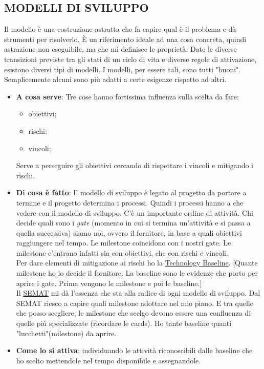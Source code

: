 		\subsection{MODELLI DI SVILUPPO}  \label{modelli}
		Il modello è una costruzione astratta che fa capire qual è il problema e dà strumenti per risolverlo. È un riferimento ideale ad una cosa concreta, quindi astrazione non eseguibile, ma che mi definisce le proprietà. Date le diverse transizioni previste tra gli stati di un ciclo di vita e diverse regole di attivazione, esistono diversi tipi di modelli.
		I modelli, per essere tali, sono tutti "buoni". Semplicemente alcuni sono più adatti a certe esigenze rispetto ad altri.
		\begin{itemize}
			\item \textbf{A cosa serve}:
			Tre cose hanno fortissima influenza sulla scelta da fare:
			\begin{itemize}
				\item obiettivi;
				\item rischi;
				\item vincoli;
			\end{itemize}
			Serve a perseguire gli obiettivi cercando di rispettare i vincoli e mitigando i rischi.
			\item \textbf{Di cosa è fatto}:
			Il modello di sviluppo è legato al progetto da portare a termine e il progetto determina i processi. Quindi i processi hanno a che vedere con il modello di sviluppo. C'è un importante ordine di attività. Chi decide quali sono i \textit{gate} (momento in cui si termina un'attività e si passa a quella successiva) siamo noi, ovvero il fornitore, in base a quali obiettivi raggiungere nel tempo. Le milestone coincidono con i nostri gate. Le milestone c'entrano infatti sia con obiettivi, che con rischi e vincoli. \\
			Per dare elementi di mitigazione ai rischi ho la \underline{\hyperref[technologybaseline]{Technology Baseline}}. [Quante milestone ho lo decide il fornitore. La baseline sono le evidenze che porto per aprire i gate. Prima vengono le milestone e poi le baseline.] \\
			Il \underline{\hyperref[semat]{SEMAT}} mi dà l'essenza che sta alla radice di ogni modello di sviluppo. Dal SEMAT riesco a capire quali milestone adottare nel mio piano. E tra quelle che posso scegliere, le milestone che scelgo devono essere una confluenza di quelle più specializzate (ricordare le cards). Ho tante baseline quanti "lucchetti"(milestone) da aprire.
			\item \textbf{Come lo si attiva}: individuando le attività riconoscibili dalle baseline che ho scelto mettendole nel tempo disponibile e assegnandole.
		\end{itemize}	
		
